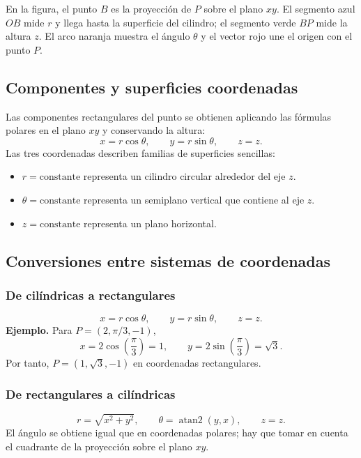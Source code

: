 En la figura, el punto $B$ es la proyección de $P$ sobre el plano $xy$. El segmento azul $OB$ mide $r$ y llega hasta la superficie del cilindro; el segmento verde $BP$ mide la altura $z$. El arco naranja muestra el ángulo $\theta$ y el vector rojo une el origen con el punto $P$.

\subsection{Componentes y superficies coordenadas}

Las componentes rectangulares del punto se obtienen aplicando las fórmulas polares en el plano $xy$ y conservando la altura:
\[
x=r\cos\theta,
\qquad
y=r\sin\theta,
\qquad
z=z.
\]
Las tres coordenadas describen familias de superficies sencillas:
\begin{itemize}
    \item $r=\text{constante}$ representa un cilindro circular alrededor del eje $z$.
    \item $\theta=\text{constante}$ representa un semiplano vertical que contiene al eje $z$.
    \item $z=\text{constante}$ representa un plano horizontal.
\end{itemize}

\subsection{Conversiones entre sistemas de coordenadas}

\subsubsection*{De cilíndricas a rectangulares}

\[
\boxed{x=r\cos\theta,\qquad y=r\sin\theta,\qquad z=z.}
\]
\textbf{Ejemplo.} Para $P=(2,\pi/3,-1)$,
\[
x=2\cos\left(\frac{\pi}{3}\right)=1,
\qquad
y=2\sin\left(\frac{\pi}{3}\right)=\sqrt{3}.
\]
Por tanto, $P=(1,\sqrt{3},-1)$ en coordenadas rectangulares.

\subsubsection*{De rectangulares a cilíndricas}

\[
\boxed{r=\sqrt{x^2+y^2},\qquad \theta=\operatorname{atan2}(y,x),\qquad z=z.}
\]
El ángulo se obtiene igual que en coordenadas polares; hay que tomar en cuenta el cuadrante de la proyección sobre el plano $xy$.

